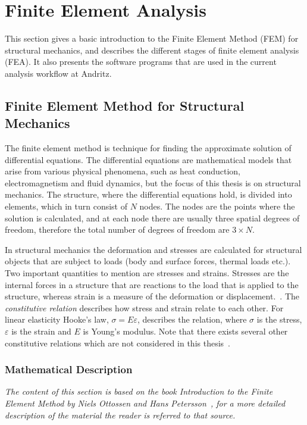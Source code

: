 
\chapter{Finite Element Analysis} %
\label{cha:finite_element_analysis}
This section gives a basic introduction to the Finite Element Method (FEM) for structural mechanics, and describes the different stages of finite element analysis (FEA). It also presents the software programs that are used in the current analysis workflow at Andritz.

\section{Finite Element Method for Structural Mechanics} %
\label{sec:finite_element_method_in_structural_mechanics}
The finite element method is technique for finding the approximate solution of differential equations. The differential equations are mathematical models that arise from various physical phenomena, such as heat conduction, electromagnetism and fluid dynamics, but the focus of this thesis is on structural mechanics. The structure, where the differential equations hold, is divided into elements, which in turn consist of $N$ nodes. The nodes are the points where the solution is calculated, and at each node there are usually three spatial degrees of freedom, therefore the total number of degrees of freedom are $3\times N$.~\cite[p.~1--4]{ottossen92}

In structural mechanics the deformation and stresses are calculated for structural objects that are subject to loads (body and surface forces, thermal loads etc.). Two important quantities to mention are stresses and strains. Stresses are the internal forces in a structure that are reactions to the load that is applied to the structure, whereas strain is a measure of the deformation or displacement.~\cite[p.~235ff.]{ottossen92}. The \textit{constitutive relation} describes how stress and strain relate to each other. For linear elasticity Hooke's law, $\sigma=E\varepsilon$, describes the relation, where $\sigma$ is the stress, $\varepsilon$ is the strain and $E$ is Young's modulus. Note that there exists several other constitutive relations which are not considered in this thesis~\cite[p.~248]{ottossen92}.

\subsection{Mathematical Description} %
\label{sub:mathematical_description}
\textit{The content of this section is based on the book Introduction to the Finite Element Method by Niels Ottossen and Hans Petersson~\cite{ottossen92}, for a more detailed description of the material the reader is referred to that source.}

